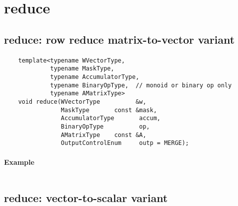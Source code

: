 \begin{verbatim}

\end{verbatim}


\section{{\sf reduce}}


\subsection{{\sf reduce}: row reduce matrix-to-vector variant}

\paragraph{\syntax}

\begin{verbatim}
    template<typename WVectorType,
             typename MaskType,
             typename AccumulatorType,
             typename BinaryOpType,  // monoid or binary op only
             typename AMatrixType>
    void reduce(WVectorType          &w,
                MaskType       const &mask,
                AccumulatorType       accum,
                BinaryOpType          op,
                AMatrixType    const &A,
                OutputControlEnum     outp = MERGE);
\end{verbatim}


\paragraph{Example}

\begin{verbatim}

\end{verbatim}


\subsection{{\sf reduce}: vector-to-scalar variant}

\paragraph{\syntax}


